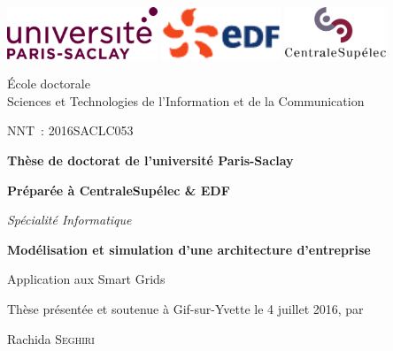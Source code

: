 \begin{titlepage}
\newcommand{\Mme}{M\textsuperscript{me}}
\vspace*{-2cm}
\includegraphics[height=1.55cm]{logo/ParisSaclay}\hfill
\includegraphics[height=1.55cm]{logo/Logo_EDF}\hfill
\includegraphics[height=1.55cm]{logo/CentraleSupelec}

\hrulefill

\begin{minipage}[t]{0.6\textwidth}
    {\small
        École doctorale \\
        Sciences et Technologies de l'Information et de la Communication\\
    }
\end{minipage}
\hfill
\begin{minipage}[t]{0.3\textwidth}
    NNT~: 2016SACLC053
\end{minipage}

\bigskip
\bigskip

\begin{center}
{\large\bfseries Thèse de doctorat de l'université Paris-Saclay}

{\large\bfseries Préparée à CentraleSupélec \& EDF}

{\large \textit{Spécialité Informatique}}

\vfill

{\LARGE\bfseries
    Modélisation et simulation d'une architecture d'entreprise
    
    Application aux Smart Grids
}

\vfill

{\large Thèse présentée et soutenue à Gif-sur-Yvette le 4 juillet 2016, par}


\bigskip

{\Large Rachida \textsc{Seghiri}}


\end{center}
\end{titlepage}
